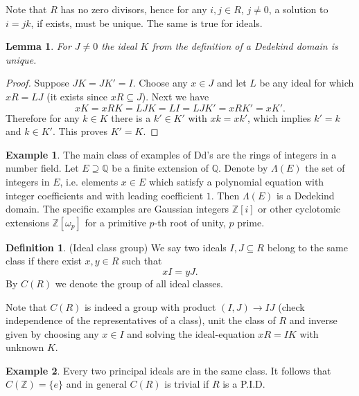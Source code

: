 \documentclass[a4paper,10pt]{article}
\theoremstyle{plain}%
\newtheorem{lem}[thm]{Lemma}
\theoremstyle{definition}
\newtheorem{defn}{Definition}
\newtheorem{exmp}{Example}
\theoremstyle{remark}
\newcommand{\ZZ}{\mathbb{Z}}
\newcommand{\QQ}{\mathbb{Q}}
\begin{document}
Note that $R$ has no zero divisors, hence for any $i,j\in R$, $j\neq 0$, a solution to $i=jk$, if exists, must be unique. The same is true for ideals.

\begin{lem}
For $J\neq 0$ the ideal $K$ from the definition of a Dedekind domain is unique.
\end{lem}
\begin{proof}
Suppose $JK=JK'=I$. Choose any $x\in J$ and let $L$ be any ideal for which $xR=LJ$ (it exists since $xR\subseteq J$). Next we have
$$xK=xRK=LJK=LI=LJK'=xRK'=xK'.$$
Therefore for any $k\in K$ there is a $k'\in K'$ with $xk=xk'$, which implies $k'=k$ and $k\in K'$. This proves $K'=K$.
\end{proof}

\begin{exmp}
The main class of examples of Dd's are the rings of integers in a number field. Let $E\supseteq\QQ$ be a finite extension of $\QQ$. Denote by $\Lambda(E)$ the set of integers in $E$, i.e. elements $x\in E$ which satisfy a polynomial equation with integer coefficients and with leading coefficient $1$. Then $\Lambda(E)$ is a Dedekind domain. The specific examples are Gaussian integers $\ZZ[i]$ or other cyclotomic extensions $\ZZ[\omega_p]$ for a primitive $p$-th root of unity, $p$ prime.
\end{exmp}
\begin{defn}
(Ideal class group) We say two ideals $I,J\subseteq R$ belong to the same class if there exist $x,y\in R$ such that
$$xI=yJ.$$
By $C(R)$ we denote the group of all ideal classes.
\end{defn}

Note that $C(R)$ is indeed a group with product $(I,J)\to IJ$ (check independence of the representatives of a class), unit the class of $R$ and inverse given by choosing any $x\in I$ and solving the ideal-equation $xR=IK$ with unknown $K$.

\begin{exmp}
Every two principal ideals are in the same class. It follows that $C(\ZZ)=\{e\}$ and in general $C(R)$ is trivial if $R$ is a P.I.D.
\end{exmp}
\end{document}
